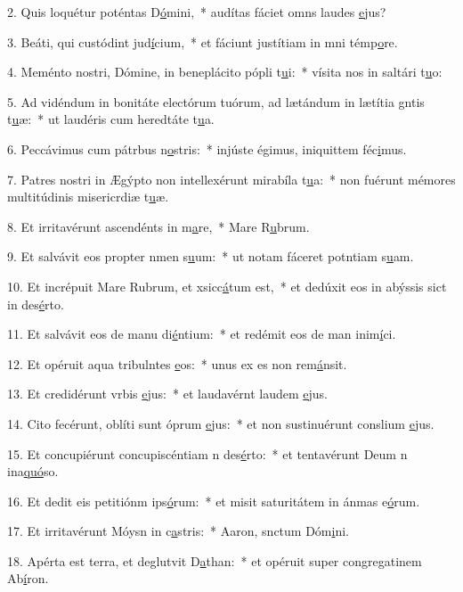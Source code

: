 2. Quis loquétur poténtas D\uline{ó}mini,~* audítas fáciet omns laudes \uline{e}jus?\par 
3. Beáti, qui custódint jud\uline{í}cium,~* et fáciunt justítiam in mni témp\uline{o}re.\par 
4. Meménto nostri, Dómine, in beneplácito pópli t\uline{u}i:~* vísita nos in saltári t\uline{u}o:\par 
5. Ad vidéndum in bonitáte electórum tuórum, ad lætándum in lætítia gntis t\uline{u}æ:~* ut laudéris cum heredtáte t\uline{u}a.\par 
6. Peccávimus cum pátrbus n\uline{o}stris:~* injúste égimus, iniquittem féc\uline{i}mus.\par 
7. Patres nostri in Ægýpto non intellexérunt mirabíla t\uline{u}a:~* non fuérunt mémores multitúdinis misericrdiæ t\uline{u}æ.\par 
8. Et irritavérunt ascendénts in m\uline{a}re,~* Mare R\uline{u}brum.\par 
9. Et salvávit eos propter nmen s\uline{u}um:~* ut notam fáceret potntiam s\uline{u}am.\par 
10. Et incrépuit Mare Rubrum, et xsicc\uline{á}tum est,~* et dedúxit eos in abýssis sict in des\uline{é}rto.\par 
11. Et salvávit eos de manu di\uline{é}ntium:~* et redémit eos de man inim\uline{í}ci.\par 
12. Et opéruit aqua tribulntes \uline{e}os:~* unus ex es non rem\uline{á}nsit.\par 
13. Et credidérunt vrbis \uline{e}jus:~* et laudavérnt laudem \uline{e}jus.\par 
14. Cito fecérunt, oblíti sunt óprum \uline{e}jus:~* et non sustinuérunt conslium \uline{e}jus.\par 
15. Et concupiérunt concupiscéntiam n des\uline{é}rto:~* et tentavérunt Deum n ina\uline{quó}so.\par 
16. Et dedit eis petitiónm ips\uline{ó}rum:~* et misit saturitátem in ánmas e\uline{ó}rum.\par 
17. Et irritavérunt Móysn in c\uline{a}stris:~* Aaron, snctum Dóm\uline{i}ni.\par 
18. Apérta est terra, et deglutvit D\uline{a}than:~* et opéruit super congregatinem Ab\uline{í}ron.\par 

